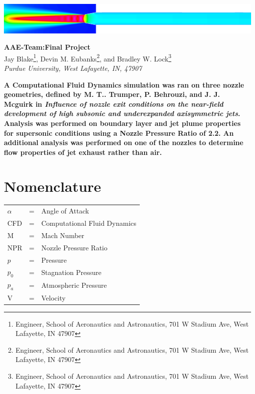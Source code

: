 \documentclass[12pt]{article} %
\title{\classnumber\:\reportnumber}
\author{Jay Blake\\Devin Eubanks\\Brad Lock\\Purdue University}
\newcommand{\classnumber}{AAE\:412\:-\:Team\:32:}
\newcommand{\reportnumber}{Final Project}
\begin{document}
\maketitle
\vspace{2in}
\begin{center}
    \includegraphics[width=\linewidth]{CoverPicture.png}
\end{center}
\clearpage
\begin{center}
{\Large\textbf{\classnumber\:\reportnumber}}\\
\vspace*{24pt}
Jay Blake\footnote{Engineer, School of Aeronautics and Astronautics, 701 W Stadium Ave, West Lafayette, IN 47907}, Devin M. Eubanks\footnote{Engineer, School of Aeronautics and Astronautics, 701 W Stadium Ave, West Lafayette, IN 47907}, and Bradley W. Lock\footnote{Engineer, School of Aeronautics and Astronautics, 701 W Stadium Ave, West Lafayette, IN 47907}\\
\textit{Purdue University, West Lafayette, IN, 47907}
\end{center}
\vspace*{48pt}
\textbf{\hspace{36pt}A Computational Fluid Dynamics simulation was ran on three nozzle geometries, defined by M. T.. Trumper, P. Behrouzi, and J. J. Mcguirk in \textit{Influence  of  nozzle  exit  conditions on  the  near-field  development  of  high  subsonic  and  underexpanded  axisymmetric  jets}. Analysis was performed on boundary layer and jet plume properties for supersonic conditions using a Nozzle Pressure Ratio of 2.2. An additional analysis was performed on one of the nozzles to determine flow properties of jet exhaust rather than air.}
\vspace*{36pt}
\section*{Nomenclature}
\begin{table}[ht]
    \begin{tabular}{l c l}
       $\alpha$&=&Angle of Attack\\
       CFD&=&Computational Fluid Dynamics\\
         M&=&Mach Number\\
         NPR&=&Nozzle Pressure Ratio\\
         $p$&=&Pressure\\
         $p_0$&=&Stagnation Pressure\\
         $p_a$&=&Atmospheric Pressure\\
         V&=&Velocity
    \end{tabular}
    \label{tab:nomenclature}
\end{table}
\end{document}

